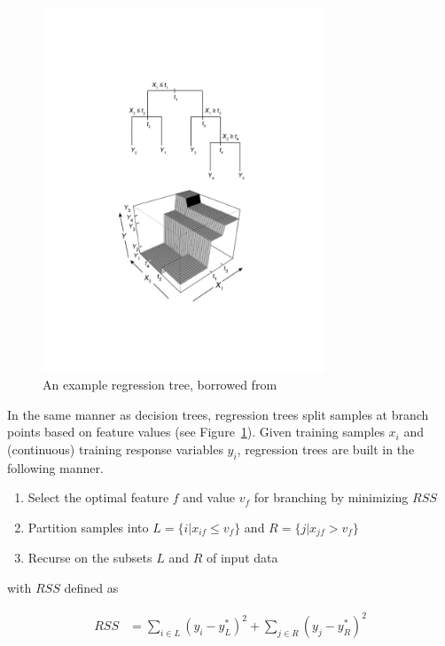 \documentclass{article} %
\begin{document}
\begin{figure}[H]
  \centering
  \includegraphics[trim={0 6cm 0 6cm}, width=0.75\textwidth]{rt.pdf}
  \caption{An example regression tree, borrowed from \cite{rffig}}
  \label{fig:regtree}
\end{figure}

In the same manner as decision trees, regression trees split samples at branch points based on feature values (see Figure~\ref{fig:regtree}). Given training samples $x_i$ and (continuous) training response variables $y_i$, regression trees are built in the following manner.

\begin{enumerate}
  \item Select the optimal feature $f$ and value $v_f$ for branching by minimizing $RSS$
  \item Partition samples into $L = \{i | x_{if} \leq v_f\}$ and $R = \{j | x_{jf} > v_f\}$
  \item Recurse on the subsets $L$ and $R$ of input data
\end{enumerate}

with $RSS$ defined as

\begin{align*}
  RSS &= \sum_{i \in L} (y_i - y_L^*)^2 + \sum_{j \in R} (y_j - y_R^*)^2
\end{align*}
\end{document}
